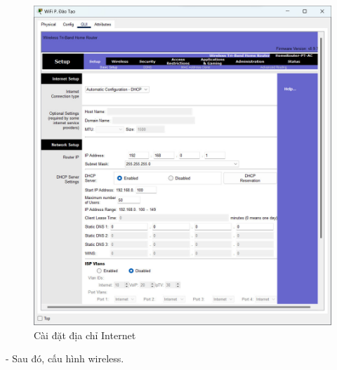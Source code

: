 \documentclass[12pt, a4paper]{article}
\begin{document}
\begin{flushleft}
\begin{figure}[H]
			\includegraphics[width=1\textwidth]{wifi_internet.jpg}
			\caption{Cài đặt địa chỉ Internet}
		\end{figure}
		\newpage
		- Sau đó, cấu hình wireless.
		\begin{figure}[H]
			\centering

\end{figure}
\end{flushleft}
\end{document}
